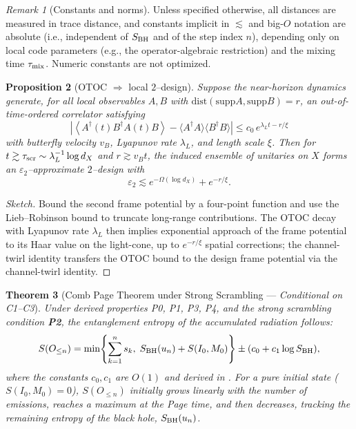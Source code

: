 \documentclass[aps,prd,preprint,onecolumn,superscriptaddress,nofootinbib,longbibliography,floatfix,11pt,showpacs,showkeys]{revtex4-2}
\newcommand{\Ptwo}{\textbf{P2}\xspace}
\theoremstyle{plain}
\newtheorem{theorem}{Theorem}
\newtheorem{proposition}[theorem]{Proposition}
\theoremstyle{definition}
\theoremstyle{remark}
\newtheorem{remark}[theorem]{Remark}
\begin{document}
\begin{remark}[Constants and norms]
Unless specified otherwise, all distances are measured in trace distance, and constants implicit in $\lesssim$
and big-$O$ notation are absolute (i.e., independent of $S_{\rm BH}$ and of the step index $n$), depending only
on local code parameters (e.g., the operator-algebraic restriction) and the mixing time $\tau_{\rm mix}$.
Numeric constants are not optimized.
\end{remark}

\begin{proposition}[OTOC $\Rightarrow$ local $2$--design]\label{prop:otoc-design}
Suppose the near-horizon dynamics generate, for all local observables $A,B$ with $\mathrm{dist}(\mathrm{supp}A,\mathrm{supp}B)=r$, an out-of-time-ordered correlator satisfying
\begin{equation}
\left|\left\langle A^\dagger(t) B^\dagger A(t) B \right\rangle - \langle A^\dagger A\rangle \langle B^\dagger B\rangle\right|
\le c_0\, e^{\lambda_L t - r/\xi}
\end{equation}
with butterfly velocity $v_B$, Lyapunov rate $\lambda_L$, and length scale $\xi$. Then for $t\gtrsim \tau_{\rm scr}\sim \lambda_L^{-1}\log d_X$ and $r\gtrsim v_B t$, the induced ensemble of unitaries on $X$ forms an $\varepsilon_2$--approximate $2$--design with
\begin{equation}
\varepsilon_2 \lesssim e^{-\Omega(\log d_X)} + e^{-r/\xi}.
\end{equation}
\end{proposition}
\begin{proof}[Sketch]
Bound the second frame potential by a four-point function and use the Lieb--Robinson bound to truncate long-range contributions. The OTOC decay with Lyapunov rate $\lambda_L$ then implies exponential approach of the frame potential to its Haar value on the light-cone, up to $e^{-r/\xi}$ spatial corrections; the channel-twirl identity transfers the OTOC bound to the design frame potential via the channel-twirl identity.
\end{proof}

\begin{theorem}[Comb Page Theorem under Strong Scrambling --- \emph{Conditional on C1--C3}]
\label{thm:comb-page}\label{thm:comb-page-strong}
Under derived properties P0, P1, P3, P4, and the strong scrambling condition \Ptwo, the entanglement entropy of the accumulated radiation follows:
\begin{equation}
\label{eq:comb-page}
S(O_{\le n}) = \min\!\left\{\sum_{k=1}^n s_k,\; S_{\rm BH}(u_n) + S(I_0, M_0)\right\} \pm (c_0 + c_1\log S_{\rm BH}),
\end{equation}
%
where the constants $c_0, c_1$ are $O(1)$ and derived in . For a pure initial state ($S(I_0, M_0)=0$), $S(O_{\le n})$ initially grows linearly with the number of emissions, reaches a maximum at the Page time, and then decreases, tracking the remaining entropy of the black hole, $S_{\rm BH}(u_n)$.
\end{theorem}
\end{document}
